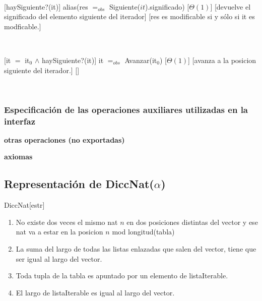 ~

[haySiguiente?(it)]
{alias(res $=_{obs}$ Siguiente($it$).significado)}
[$\Theta(1)$]
[devuelve el significado del elemento siguiente del iterador]
[res es modificable si y sólo si it es modficable.]

~

[it $=$ it$_0$ $\land$ haySiguiente?(it)]
{it $=_{obs}$ Avanzar(it$_0$)}
[$\Theta(1)$]
[avanza a la posicion siguiente del iterador.]
[]

~

\subsubsection{Especificación de las operaciones auxiliares utilizadas en la interfaz}

\begin{tad}{}
	\textbf{otras operaciones (no exportadas)}


	\textbf{axiomas}

\end{tad}

\pagebreak

\subsection{Representación de DiccNat($\alpha$)}

\begin{Estructura}{DiccNat}[estr]
	\begin{Tupla}[estr]
	\end{Tupla}
\end{Estructura}

\begin{enumerate}
	\item No existe dos veces el mismo nat $n$ en dos posiciones distintas del vector y ese nat va a estar en la posicion $n$ mod longitud(tabla)
	\item La suma del largo de todas las listas enlazadas que salen del vector, tiene que ser igual al largo del vector.
	\item Toda tupla de la tabla es apuntado por un elemento de listaIterable.
	\item El largo de listaIterable es igual al largo del vector.
\end{enumerate}

